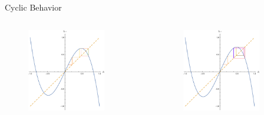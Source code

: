 \documentclass{beamer}
\begin{document}
\begin{frame}{Cyclic Behavior}
	\begin{columns}
		\begin{column}{0.5\textwidth}
			\begin{figure}
				\centering
				\includegraphics[height=0.8\textwidth,width=0.8\textwidth]{2_cycle.pdf}
			\end{figure}
		\end{column}
		\begin{column}{0.5\textwidth}
			\begin{figure}
				\centering
				\includegraphics[height=\textwidth,width=0.8\textwidth]{8_cycle.pdf}
			\end{figure}
		\end{column}
	\end{columns}
\end{frame}
\end{document}
